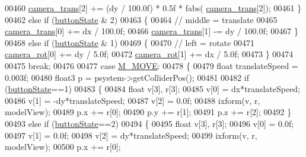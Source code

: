 \begin{DoxyCode}
{{{00460                 \hyperlink{particles_8cpp_affab132fdfca08b149d2f866fd486ed4}{camera\_trans}[2] += (dy / 100.0f) * 0.5f * fabs(
      \hyperlink{particles_8cpp_affab132fdfca08b149d2f866fd486ed4}{camera\_trans}[2]);
00461             \}
00462             \textcolor{keywordflow}{else} \textcolor{keywordflow}{if} (\hyperlink{particles_8cpp_a5002611f83f5a861df12917dd5651db8}{buttonState} & 2)
00463             \{
00464                 \textcolor{comment}{// middle = translate}
00465                 \hyperlink{particles_8cpp_affab132fdfca08b149d2f866fd486ed4}{camera\_trans}[0] += dx / 100.0f;
00466                 \hyperlink{particles_8cpp_affab132fdfca08b149d2f866fd486ed4}{camera\_trans}[1] -= dy / 100.0f;
00467             \}
00468             \textcolor{keywordflow}{else} \textcolor{keywordflow}{if} (\hyperlink{particles_8cpp_a5002611f83f5a861df12917dd5651db8}{buttonState} & 1)
00469             \{
00470                 \textcolor{comment}{// left = rotate}
00471                 \hyperlink{particles_8cpp_a9fcb578cacbd3a3b1ab593fc123cffb5}{camera\_rot}[0] += dy / 5.0f;
00472                 \hyperlink{particles_8cpp_a9fcb578cacbd3a3b1ab593fc123cffb5}{camera\_rot}[1] += dx / 5.0f;
00473             \}
00474 
00475             \textcolor{keywordflow}{break};
00476 
00477         \textcolor{keywordflow}{case} \hyperlink{particles_8cpp_a06fc87d81c62e9abb8790b6e5713c55babab1d9d2c1a77a18fc6ae9032fd18057}{M\_MOVE}:
00478             \{
00479                 \textcolor{keywordtype}{float} translateSpeed = 0.003f;
00480                 float3 p = psystem->getColliderPos();
00481 
00482                 \textcolor{keywordflow}{if} (\hyperlink{particles_8cpp_a5002611f83f5a861df12917dd5651db8}{buttonState}==1)
00483                 \{
00484                     \textcolor{keywordtype}{float} v[3], r[3];
00485                     v[0] = dx*translateSpeed;
00486                     v[1] = -dy*translateSpeed;
00487                     v[2] = 0.0f;
00488                     ixform(v, r, modelView);
00489                     p.x += r[0];
00490                     p.y += r[1];
00491                     p.z += r[2];
00492                 \}
00493                 \textcolor{keywordflow}{else} \textcolor{keywordflow}{if} (\hyperlink{particles_8cpp_a5002611f83f5a861df12917dd5651db8}{buttonState}==2)
00494                 \{
00495                     \textcolor{keywordtype}{float} v[3], r[3];
00496                     v[0] = 0.0f;
00497                     v[1] = 0.0f;
00498                     v[2] = dy*translateSpeed;
00499                     ixform(v, r, modelView);
00500                     p.x += r[0];
}}}
\end{DoxyCode}

